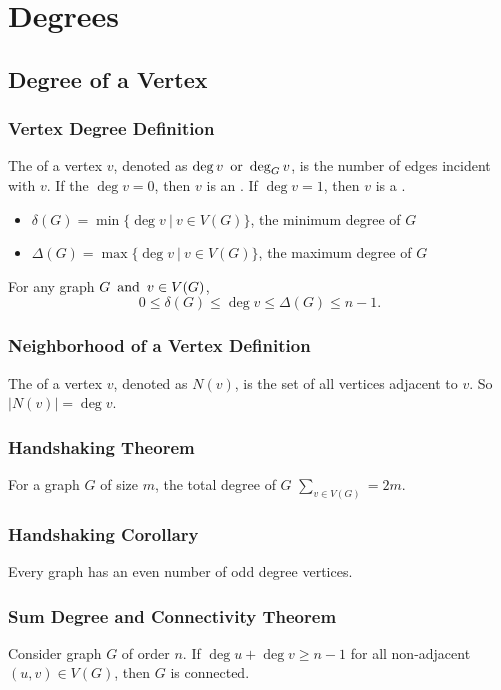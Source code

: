 \section{Degrees}

\subsection{Degree of a Vertex}

\subsubsection*{Vertex Degree Definition}
The  of a vertex $v$, denoted as $\deg v \operatorname{~\text{or}~} \deg_G v$, is the number of edges incident with $v$. If the $\deg v = 0$, then $v$ is an . If $\deg v = 1$, then $v$ is a .
\begin{itemize}
    \item $\delta(G) = \min\{\deg v ~|~ v \in V(G)\}$, the minimum degree of $G$
    \item $\Delta(G) = \max\{\deg v ~|~ v \in V(G)\}$, the maximum degree of $G$
\end{itemize}
For any graph $G \operatorname{~\text{and}~} v \in V(G)$,
\[
    0 \leq \delta(G) \leq \deg v \leq \Delta(G) \leq n-1.
\]

\subsubsection*{Neighborhood of a Vertex Definition}
The  of a vertex $v$, denoted as $N(v)$, is the set of all vertices adjacent to $v$. So $\lvert N(v) \rvert = \deg v$.

\subsubsection*{Handshaking Theorem}
For a graph $G$ of size $m$, the total degree of $G$ $\sum_{v \in V(G)} = 2m$.

\subsubsection*{Handshaking Corollary}
Every graph has an even number of odd degree vertices.

\subsubsection*{Sum Degree and Connectivity Theorem}
Consider graph $G$ of order $n$. If $\deg u + \deg v \geq n-1$ for all non-adjacent $(u,v) \in V(G)$, then $G$ is connected.

